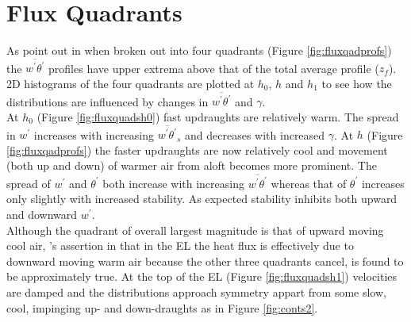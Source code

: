 
\clearpage

\section{Flux Quadrants}
\label{sec:fluxquadrants}     
\FloatBarrier

As \citeauthor{SullMoengStev} point out in \cite{SullMoengStev} when broken out into four quadrants 
(Figure \ref{fig:fluxqadprofs}) the $\overline{w^{'}\theta^{'}}$ profiles have upper extrema above 
that of the total average profile ($z_{f}$).  2D histograms of the four quadrants are plotted at $h_{0}$, $h$ 
and $h_{1}$ to see how the distributions are influenced by changes in $\overline{w^{'} \theta^{'}}$ 
and $\gamma$.\\

 At $h_{0}$ (Figure \ref{fig:fluxquadsh0}) fast updraughts are relatively warm.  The spread in $w^{'}$ 
increases with increasing $\overline{w^{'}\theta^{'}}_{s}$ and decreases with increased $\gamma$.
At $h$ (Figure \ref{fig:fluxqadprofs}) the faster updraughts are now relatively cool and movement 
(both up and down) of warmer air from aloft becomes more prominent.  The spread of $w^{'}$ 
and $\theta^{'}$ both increase with increasing $\overline{w^{'}\theta^{'}}$ whereas that of
$\theta^{'}$ increases only slightly with increased stability.  As expected stability inhibits both
upward and downward $w^{'}$. \\ 

Although the quadrant of overall largest magnitude is that of
upward moving cool air, \citeauthor{SullMoengStev}'s assertion in \cite{SullMoengStev}
that in the \acs{EL} the heat flux is effectively due to downward moving warm air because
the other three quadrants cancel, is found to be approximately true.  At the top of the EL (Figure \ref{fig:fluxquadsh1}) 
velocities are damped and the distributions approach symmetry appart from some slow, cool, impinging up- 
and down-draughts as in Figure \ref{fig:conts2}. \\

